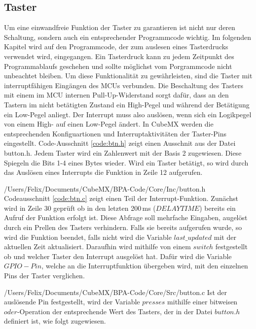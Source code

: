 
\subsection{Taster}
Um eine einwandfreie Funktion der Taster zu garantieren ist nicht nur deren Schaltung, sondern auch ein entsprechender Programmcode wichtig. Im folgenden Kapitel wird auf den Programmcode, der zum auslesen eines Tasterdrucks verwendet wird, eingegangen. Ein Tasterdruck kann zu jedem Zeitpunkt des Programmablaufs geschehen und sollte möglichst vom Porgrammcode nicht unbeachtet bleiben. Um diese Funktionalität zu gewährleisten, sind die Taster mit interruptfähigen Eingängen des MCUs verbunden. Die Beschaltung des Tasters mit einem im MCU internen Pull-Up-Widerstand sorgt dafür, dass an den Tastern im nicht betätigten Zustand ein High-Pegel und während der Betätigung ein Low-Pegel anliegt. Der Interrupt muss also auslösen, wenn sich ein Logikpegel von einem High- auf einen Low-Pegel ändert. In CubeMX werden die entsprechenden Konfiguartionen und Interruptaktivitäten der Taster-Pins eingestellt. Code-Ausschnitt \ref{code:btn.h} zeigt einen Ausschnit aus der Datei button.h. Jedem Taster wird ein Zahlenwert mit der Basis 2 zugewiesen. Diese Spiegeln die Bits 1-4 eines Bytes wieder. Wird ein Taster betätigt, so wird  durch das Auslösen eines Interrupts die Funktion in Zeile 12 aufgerufen.

{/Users/Felix/Documents/CubeMX/BPA-Code/Core/Inc/button.h} 
Codeausschnitt \ref{code:btn.c} zeigt einen Teil der Interrupt-Funktion. Zunächst wird in Zeile 30 geprüft ob in den letzten 200\,ms ($DELAYTIME$) bereits ein Aufruf der Funktion erfolgt ist. Diese Abfrage soll mehrfache Eingaben, augelöst durch ein Prellen des Tasters verhindern. Falls sie bereits aufgerufen wurde, so wird die Funktion beendet, falls nicht wird die Variable $last\_updated$ mit der aktuellen Zeit aktualisiert. Daraufhin wird mithilfe von einem $switch$ festgestellt ob und welcher Taster den Interrupt ausgelöst hat. Dafür wird die Variable $GPIO-Pin$, welche an die Interruptfunktion übergeben wird, mit den einzelnen Pins der Taster verglichen. 

{/Users/Felix/Documents/CubeMX/BPA-Code/Core/Src/button.c}
Ist der auslösende Pin festgestellt, wird der Variable $presses$ mithilfe einer bitweisen $oder$-Operation der entsprechende Wert des Tasters, der in der Datei $button.h$ definiert ist, wie folgt zugewiesen.
